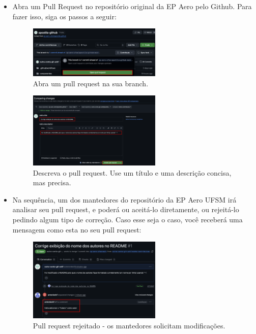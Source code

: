 \begin{itemize}
        \item Abra um Pull Request no repositório original da EP Aero pelo Github. Para fazer isso, siga os passos a seguir:

    \begin{figure}[H]
        \centering
        \includegraphics[width=0.6\textwidth]{imgs/tutorial_contribuicao/abrir_pull_request.png}
        \caption{Abra um pull request na sua branch.}
        \label{fig:abrir_pr}
    \end{figure}

    \begin{figure}[H]
        \centering
        \includegraphics[width=0.6\textwidth]{imgs/tutorial_contribuicao/configurando_pull_request.png}
        \caption{Descreva o pull request. Use um título e uma descrição concisa, mas precisa.}
        \label{fig:configurar_pr}
    \end{figure}

    \item Na sequência, um dos mantedores do repositório da EP Aero UFSM irá analisar seu pull request, e poderá ou aceitá-lo diretamente, ou rejeitá-lo pedindo algum tipo de correção. Caso esse seja o caso, você receberá uma mensagem como esta no seu pull request:

    \begin{figure}[H]
        \centering
        \includegraphics[width=0.6\textwidth]{imgs/tutorial_contribuicao/pr_rejeitado.png}
        \caption{Pull request rejeitado - os mantedores solicitam modificações.}
        \label{fig:pr_rejeitado}
    \end{figure}


\end{itemize}
